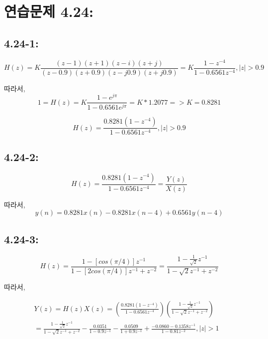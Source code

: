 \documentclass[11pt
  , a4paper
  , article
  , oneside
]{memoir}
\begin{document}
\chapter{연습문제 4.24: }
\section{4.24-1: }

\begin {equation}
H(z) = K\frac{(z-1)(z+1)(z-i)(z+j)}{(z-0.9)(z+0.9)(z-j0.9)(z+j0.9)} = K\frac{1-z^{-4}}{1-0.6561z^{-4}}, |z|>0.9 \nonumber
\end {equation}

따라서,
\begin {equation}
1 = H(z) = K\frac{1-e^{j\pi}}{1-0.6561e^{j\pi}} = K * 1.2077 => K = 0.8281 \nonumber
\end {equation}

\begin {equation}
H(z) = \frac{0.8281(1-z^{-4})}{1-0.6561z^{-4}}, |z| > 0.9 \nonumber
\end {equation}


\section{4.24-2: }
\begin {equation}
H(z) = \frac{0.8281(1-z^{-4})}{1-0.6561z^{-4}} = \frac{Y(z)}{X(z)} \nonumber
\end {equation}

따라서,
\begin {equation}
y(n) = 0.8281x(n) - 0.8281x(n-4) + 0.6561y(n-4) \nonumber
\end {equation}

\section{4.24-3: }
\begin {equation}
H(z) = \frac{1-[cos(\pi/4)]z^{-1}}{1-[2cos(\pi/4)]z^{-1} + z^{-2}} = \frac{1-\frac{1}{\sqrt{2}}z^{-1}}{1-\sqrt{2}z^{-1}+z^{-2}}   \nonumber
\end {equation}

따라서,

\begin {equation}
\begin {split}
Y(z)=H(z)X(z) = (\frac{0.8281(1-z^{-4})}{1-0.6561z^{-4}})(\frac{1-\frac{1}{\sqrt{2}}z^{-1}}{1-\sqrt{2}z^{-1}+z^{-2}}) &\\
= \frac{1-\frac{1}{\sqrt{2}}z^{-1}}{1-\sqrt{2}z^{-1}+z^{-2}}-\frac{0.0351}{1-0.9z^{-1}}-\frac{0.0509}{1+0.9z^{-1}} + \frac{-0.0860 - 0.1358z^{-1}}{1-0.81z^{-2}}, |z| >1    \nonumber
\end{split}
\end {equation}
\end{document}
